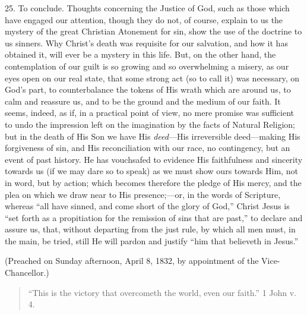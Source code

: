 25. To conclude. Thoughts concerning the Justice of God, such as
those which have engaged our attention, though they do not, of course,
explain to us the mystery of the great Christian Atonement for sin,
show the use of the doctrine to us sinners. Why Christ's death was
requisite for our salvation, and how it has obtained it, will ever be
a mystery in this life. But, on the other hand, the contemplation of
our guilt is so growing and so overwhelming a misery, as our eyes open
on our real state, that some strong act (so to call it) was necessary,
on God's part, to counterbalance the tokens of His wrath which are
around us, to calm and reassure us, and to be the ground and the
medium of our faith. It seems, indeed, as if, in a practical point of
view, no mere promise was sufficient to undo the impression left on
the imagination by the facts of Natural Religion; but in the death of
His Son we have His \emph{deed}—His irreversible deed—making His
forgiveness of sin, and His reconciliation with our race, no
contingency, but an event of past history. He has vouchsafed to
evidence His faithfulness and sincerity towards us (if we may dare so
to speak) as we must show ours towards Him, not in word, but by
action; which becomes therefore the pledge of His mercy, and the plea
on which we draw near to His presence;—or, in the words of
Scripture, whereas ``all have sinned, and come short of the glory
of God,'' Christ Jesus is ``set forth as a propitiation for
the remission of sins that are past,'' to declare and assure us,
that, without departing from the just rule, by which all men must, in
the main, be tried, still He will pardon and justify ``him that
believeth in Jesus.''

(Preached on Sunday afternoon, April 8, 1832, by appointment of the
Vice-Chancellor.)


\begin{quote}

``This is the victory that overcometh the world, even our
faith.'' 1 John v. 4.

\end{quote}

